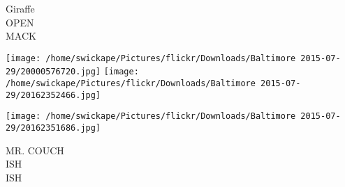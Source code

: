 \documentclass[10pt,letterpaper]{article}
\begin{document}
Giraffe\\
OPEN\\
MACK
\pagebreak

\texttt{[image: /home/swickape/Pictures/flickr/Downloads/Baltimore 2015-07-29/20000576720.jpg]}
\texttt{[image: /home/swickape/Pictures/flickr/Downloads/Baltimore 2015-07-29/20162352466.jpg]}

\texttt{[image: /home/swickape/Pictures/flickr/Downloads/Baltimore 2015-07-29/20162351686.jpg]}

MR. COUCH\\
ISH\\
ISH
\pagebreak
\end{document}
